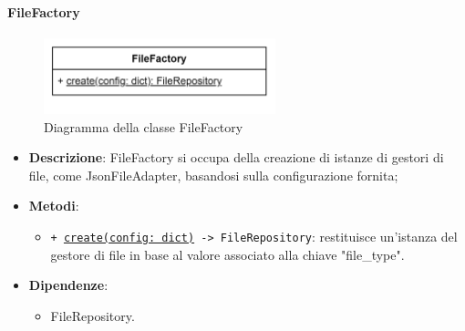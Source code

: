 \paragraph{FileFactory} \label{FileFactory}
\begin{figure}[H]
    \centering
    \includegraphics[width=0.6\textwidth]{assets/Backend/file_factory.png}
    \caption{Diagramma della classe FileFactory}
  \end{figure}
\begin{itemize}
    \item \textbf{Descrizione}: FileFactory si occupa della creazione di istanze di gestori di file, come JsonFileAdapter, basandosi sulla configurazione fornita;
    \item \textbf{Metodi}:
    \begin{itemize}
        \item \texttt{+ \underline{create(config: dict)} -> FileRepository}: restituisce un'istanza del gestore di file in base al valore associato alla chiave "file_type".
    \end{itemize}
    \item \textbf{Dipendenze}:
    \begin{itemize}
        \item FileRepository.
    \end{itemize}
\end{itemize} 

